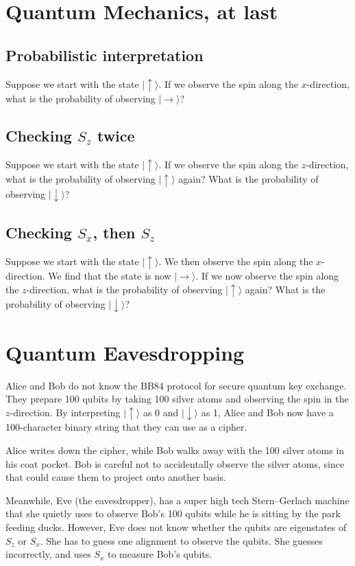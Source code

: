 \documentclass[12pt]{article}
\numberwithin{equation}{section}    %
\begin{document}
\section{Quantum Mechanics, at last}

\subsection{Probabilistic interpretation}
Suppose we start with the state $|\uparrow\rangle$. If we observe the spin along the $x$-direction, what is the probability of observing $|\rightarrow\rangle$?

\subsection{Checking $S_z$ twice}
Suppose we start with the state $|\uparrow\rangle$. If we observe the spin along the $z$-direction, what is the probability of observing $|\uparrow\rangle$ again? What is the probability of observing $|\downarrow\rangle$?

\subsection{Checking $S_x$, then $S_z$}
Suppose we start with the state $|\uparrow\rangle$. We then observe the spin along the $x$-direction. We find that the state is now $|\rightarrow\rangle$. If we now observe the spin along the $z$-direction, what is the probability of observing $|\uparrow\rangle$ again? What is the probability of observing $|\downarrow\rangle$?

\section{Quantum Eavesdropping}

Alice and Bob do not know the BB84 protocol for secure quantum key exchange. They prepare 100 qubits by taking 100 silver atoms and observing the spin in the $z$-direction. By interpreting $|\uparrow\rangle$ as 0 and $|\downarrow\rangle$ as 1, Alice and Bob now have a 100-character binary string that they can use as a cipher. 

Alice writes down the cipher, while Bob walks away with the 100 silver atoms in his coat pocket. Bob is careful not to accidentally observe the silver atoms, since that could cause them to project onto another basis.

Meanwhile, Eve (the eavesdropper), has a super high tech Stern--Gerlach machine that she quietly uses to observe Bob's 100 qubits while he is sitting by the park feeding ducks. However, Eve does not know whether the qubits are eigenstates of $S_z$ or $S_x$. She has to guess one alignment to observe the qubits. She guesses incorrectly, and uses $S_x$ to measure Bob's qubits.
\end{document}

